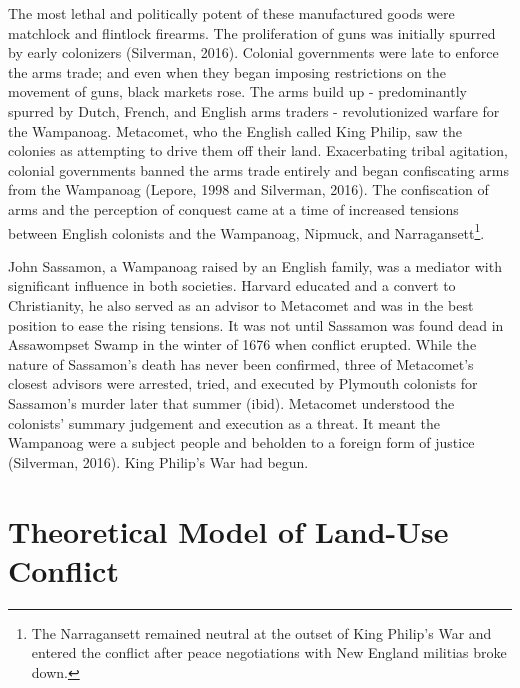 \documentclass[sn-mathphys]{sn-jnl}%
\theoremstyle{thmstyleone}%
\theoremstyle{thmstyletwo}%
\theoremstyle{thmstylethree}%
\begin{document}
The most lethal and politically potent of these manufactured goods were matchlock and flintlock firearms. The proliferation of guns was initially spurred by early colonizers (Silverman, 2016). Colonial governments were late to enforce the arms trade; and even when they began imposing restrictions on the movement of guns, black markets rose. The arms build up - predominantly spurred by Dutch, French, and English arms traders - revolutionized warfare for the Wampanoag. Metacomet, who the English called King Philip, saw the colonies as attempting to drive them off their land. Exacerbating tribal agitation, colonial governments banned the arms trade entirely and began confiscating arms from the Wampanoag (Lepore, 1998 and Silverman, 2016). The confiscation of arms and the perception of conquest came at a time of increased tensions between English colonists and the Wampanoag, Nipmuck, and Narragansett\footnote{The Narragansett remained neutral at the outset of King Philip's War and entered the conflict after peace negotiations with New England militias broke down.}. 

John Sassamon, a Wampanoag raised by an English family, was a mediator with significant influence in both societies. Harvard educated and a convert to Christianity, he also served as an advisor to Metacomet and was in the best position to ease the rising tensions. It was not until Sassamon was found dead in Assawompset Swamp in the winter of 1676 when conflict erupted. While the nature of Sassamon's death has never been confirmed, three of Metacomet's closest advisors were arrested, tried, and executed by Plymouth colonists for Sassamon's murder later that summer (ibid). Metacomet understood the colonists' summary judgement and execution as a threat. It meant the Wampanoag were a subject people and beholden to a foreign form of justice (Silverman, 2016). King Philip's War had begun.

\section{Theoretical Model of Land-Use Conflict}\label{sec3}


\end{document}
